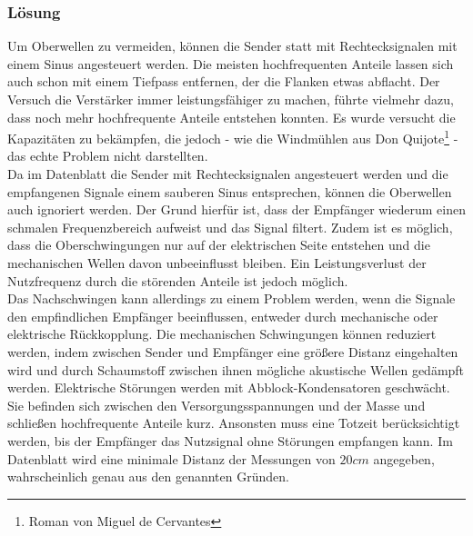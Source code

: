 \subsubsection{Lösung}
Um Oberwellen zu vermeiden, können die Sender statt mit Rechtecksignalen mit einem Sinus angesteuert werden. Die meisten hochfrequenten Anteile lassen sich auch schon mit einem Tiefpass entfernen, der die Flanken etwas abflacht. Der Versuch die Verstärker immer leistungsfähiger zu machen, führte vielmehr dazu, dass noch mehr hochfrequente Anteile entstehen konnten. Es wurde versucht die Kapazitäten zu bekämpfen, die jedoch - wie die Windmühlen aus Don Quijote\footnote{Roman von Miguel de Cervantes} - das echte Problem nicht darstellten.\\
Da im Datenblatt die Sender mit Rechtecksignalen angesteuert werden und die empfangenen Signale einem sauberen Sinus entsprechen, können die Oberwellen auch ignoriert werden. Der Grund hierfür ist, dass der Empfänger wiederum einen schmalen Frequenzbereich aufweist und das Signal filtert. Zudem ist es möglich, dass die Oberschwingungen nur auf der elektrischen Seite entstehen und die mechanischen Wellen davon unbeeinflusst bleiben. Ein Leistungsverlust der Nutzfrequenz durch die störenden Anteile ist jedoch möglich.\\
Das Nachschwingen kann allerdings zu einem Problem werden, wenn die Signale den empfindlichen Empfänger beeinflussen, entweder durch mechanische oder elektrische Rückkopplung. Die mechanischen Schwingungen können reduziert werden, indem zwischen Sender und Empfänger eine größere Distanz eingehalten wird und durch Schaumstoff zwischen ihnen mögliche akustische Wellen gedämpft werden. Elektrische Störungen werden mit Abblock-Kondensatoren geschwächt. Sie befinden sich zwischen den Versorgungsspannungen und der Masse und schließen hochfrequente Anteile kurz. Ansonsten muss eine Totzeit berücksichtigt werden, bis der Empfänger das Nutzsignal ohne Störungen empfangen kann. Im Datenblatt wird eine minimale Distanz der Messungen von $20cm$ angegeben, wahrscheinlich genau aus den genannten Gründen.

